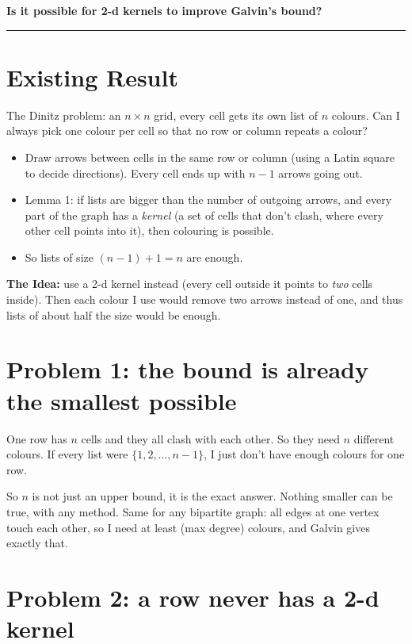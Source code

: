 \documentclass[11pt,a4paper]{article}
\begin{document}
{\large\bfseries Is it possible for 2-d kernels to improve Galvin's bound?}\\[2pt]

\medskip\hrule\medskip

\section*{Existing Result}

The Dinitz problem: an $n\times n$ grid, every cell gets its own list of $n$ colours. Can I always pick one colour per cell so that no row or column repeats a colour?

\begin{itemize}[leftmargin=1.4em]
    \item Draw arrows between cells in the same row or column (using a Latin square to decide directions). Every cell ends up with $n-1$ arrows going out.
    \item Lemma 1: if lists are bigger than the number of outgoing arrows, and every part of the graph has a \emph{kernel} (a set of cells that don't clash, where every other cell points into it), then colouring is possible.
    \item So lists of size $(n-1)+1=n$ are enough.
\end{itemize}

\textbf{The Idea:} use a 2-d kernel instead (every cell outside it points to \emph{two} cells inside). Then each colour I use would remove two arrows instead of one, and thus lists of about half the size would be enough.

\section*{Problem 1: the bound is already the smallest possible}

One row has $n$ cells and they all clash with each other. So they need $n$ different colours. If every list were $\{1,2,\dots,n-1\}$, I just don't have enough colours for one row.

So $n$ is not just an upper bound, it is the exact answer. Nothing smaller can be true, with any method. Same for any bipartite graph: all edges at one vertex touch each other, so I need at least (max degree) colours, and Galvin gives exactly that.

\section*{Problem 2: a row never has a 2-d kernel}
\end{document}
